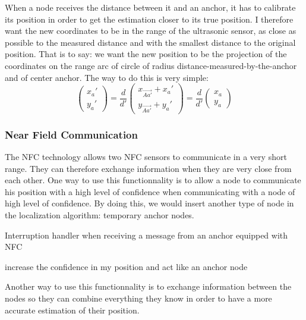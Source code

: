 \documentclass[a4paper,10pt]{article}
\begin{document}
\noindent
When a node receives the distance between it and an anchor, it has to calibrate its position in order to get the estimation closer to its true 
position. I therefore want the new coordinates to be in the range of the ultrasonic sensor, as close as possible to the measured distance and 
with the smallest distance to the original position. That is to say: we want the new position to be the projection of the coordinates on the range 
arc of circle of radius distance-measured-by-the-anchor and of center anchor. The way to do this is very simple:
$$\left(\begin{array}{l}
		      x_a' \\
		      y_a'
                    \end{array}\right)
=\frac{d}{d'}\left(\begin{array}{l}
		      x_{\overrightarrow{Aa'}} + x_a' \\
		      y_{\overrightarrow{Aa'}} + y_a'
                    \end{array}\right)
                    =\frac{d}{d'}\left(\begin{array}{l}	
		      x_a \\
		      y_a
                    \end{array}\right)
$$

\subsubsection{Near Field Communication}
The NFC technology allows two NFC sensors to communicate in a very short range. They can therefore exchange information when they are very close
from each other. One way to use this functionnality is to allow a node to communicate his position with a high level of confidence when communicating
with a node of high level of confidence. By doing this, we would insert another type of node in the localization algorithm: temporary anchor
nodes.
\begin{algorithm}[H]
\caption{Interruption handler when receiving a message from an anchor equipped with NFC}
\begin{algorithmic}[H]
\STATE increase the confidence in my position and act like an anchor node
\ENDWHILE
\end{algorithmic}
\end{algorithm}
\noindent
Another way to use this functionnality is to exchange information between the nodes so they can combine
everything they know in order to have a more accurate estimation of their position.
\end{document}
